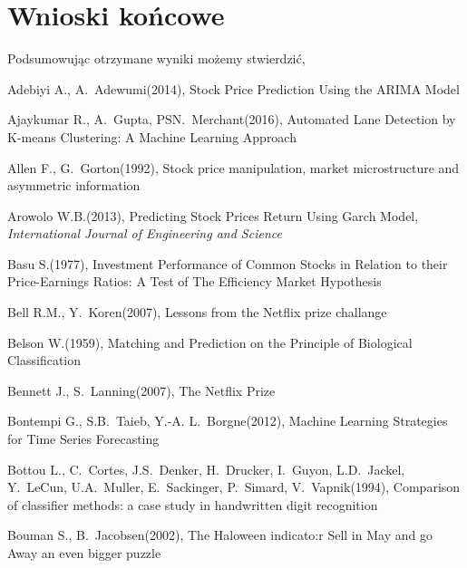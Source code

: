 \documentclass[12pt,a4paper,twoside,openany]{book}
\begin{document}
\chapter{Wnioski końcowe}

Podsumowując otrzymane wyniki możemy stwierdzić, 




\clearpage
{}
\begin{thebibliography}{99}
\setlength{\itemsep}{0pt}%

 Adebiyi A., A.~Adewumi(2014), Stock Price Prediction Using the ARIMA Model

 Ajaykumar R., A.~Gupta, PSN.~Merchant(2016), Automated Lane Detection by K-means Clustering: A Machine Learning Approach 

 Allen F., G.~Gorton(1992), Stock price manipulation, market microstructure and asymmetric information

 Arowolo W.B.(2013), Predicting Stock Prices Return Using Garch Model, \textit{International Journal of Engineering and Science}

 Basu S.(1977), Investment Performance of Common Stocks in Relation to their Price-Earnings Ratios: A Test of The Efficiency Market Hypothesis

 Bell R.M., Y.~Koren(2007), Lessons from the Netflix prize challange

 Belson W.(1959), Matching and Prediction on the Principle of Biological Classification

 Bennett J., S.~Lanning(2007), The Netflix Prize

 Bontempi G., S.B.~Taieb, Y.-A. L.~Borgne(2012), Machine Learning Strategies for Time Series Forecasting

 Bottou L., C.~Cortes, J.S.~Denker, H.~Drucker, I.~Guyon, L.D.~Jackel, Y.~LeCun, U.A.~Muller, E.~Sackinger, P.~Simard, V.~Vapnik(1994), Comparison of classifier methods: a case study in handwritten digit recognition

 Bouman S., B.~Jacobsen(2002), The Haloween indicato:r Sell in May and go Away an even bigger puzzle


\end{thebibliography}
\end{document}
